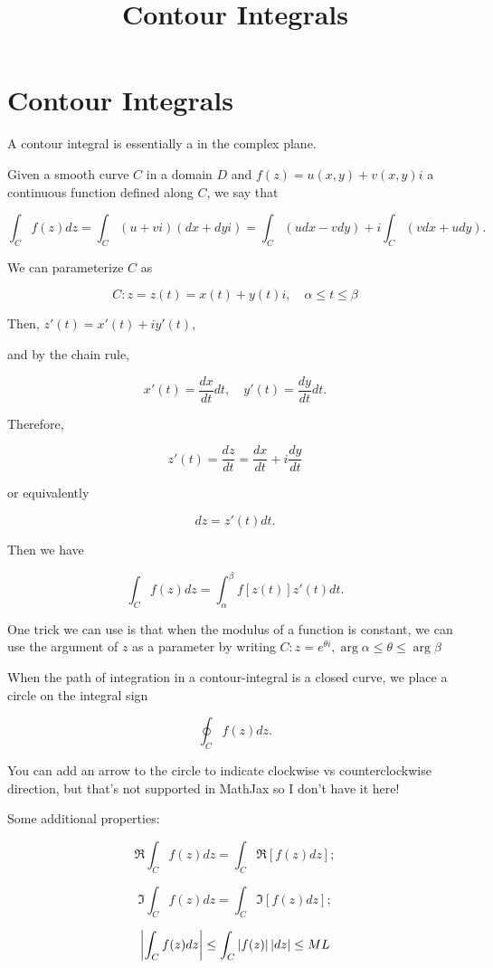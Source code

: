 \documentclass{article}
\title{Contour Integrals}
\begin{document}
\section{Contour Integrals}

A contour integral is essentially a  in the complex plane.

\begin{definition}
Given a \@{smooth} curve $C$ in a \@{domain} $D$ and $f(z) = u(x,y) + v(x,y)i$ a \@{continuous} \@{function} defined along $C$, we say that

\[ \int_{C} f(z) dz = \int_C (u+vi)(dx + dyi) = \int_C ( u dx - vdy ) + i \int_C (vdx + udy). \]

We can parameterize $C$ as

\[ C : z = z(t) = x(t) + y(t)i, \quad \alpha \le t \le \beta \]

Then, $z'(t) = x'(t) + i y'(t),$

and by the chain rule,

\[ x'(t) = \frac{dx}{dt} dt, \quad y'(t) = \frac{dy}{dt} dt. \]

Therefore,

\[ z'(t) =  \frac{dz}{dt} = \frac{dx}{dt} + i \frac{dy}{dt} \]

or equivalently

\[ dz = z'(t) dt. \]

Then we have 

\[ \int_C f(z) dz = \int_\alpha^\beta f[z(t)] z'(t) dt. \]
\end{definition}

One trick we can use is that when the modulus of a function is constant, we can use the argument of $z$ as a parameter by writing $C: z = e^{\theta i}, \arg{\alpha} \le \theta \le \arg{\beta}$

When the path of integration in a \@{contour-integral} is a closed curve, we place a circle on the integral sign

\[ \oint_C f(z) dz. \]

You can add an arrow to the circle to indicate clockwise vs counterclockwise direction, but that's not supported in MathJax so I don't have it here!

Some additional properties:

\[ \Re \int_C f(z) dz = \int_C \Re[f(z)dz]; \]

\[ \Im \int_C f(z) dz = \int_C \Im[f(z)dz]; \]

\[ \left| \int_C f(z) dz \right| \le \int_C \left| f(z) \right| \left| dz \right| \le ML \]
\end{document}
